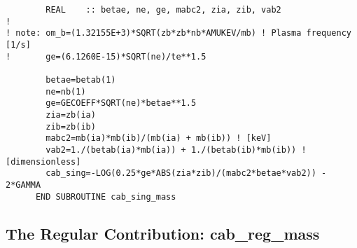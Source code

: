 \documentclass[preprint,12pt,eqsecnum,nofootinbib,amsmath,amssymb]{revtex4}
\begin{document}
{{{{{\begin{verbatim}
        REAL    :: betae, ne, ge, mabc2, zia, zib, vab2
!
! note: om_b=(1.32155E+3)*SQRT(zb*zb*nb*AMUKEV/mb) ! Plasma frequency [1/s]
!       ge=(6.1260E-15)*SQRT(ne)/te**1.5

        betae=betab(1)
        ne=nb(1)
        ge=GECOEFF*SQRT(ne)*betae**1.5
        zia=zb(ia)
        zib=zb(ib)
        mabc2=mb(ia)*mb(ib)/(mb(ia) + mb(ib)) ! [keV]
        vab2=1./(betab(ia)*mb(ia)) + 1./(betab(ib)*mb(ib)) ! [dimensionless]
        cab_sing=-LOG(0.25*ge*ABS(zia*zib)/(mabc2*betae*vab2)) - 2*GAMMA 
      END SUBROUTINE cab_sing_mass
\end{verbatim}


\subsection{The Regular Contribution: cab\_reg\_mass}

}}}}}
\end{document}
